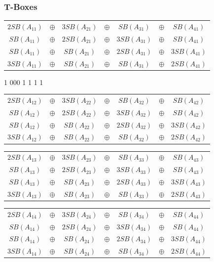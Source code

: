 \documentclass{beamer}
\begin{document}
\frame
{
	\frametitle{T-Boxes}
\tiny

\begin{tabular}{|ccccccc|}
$2SB(A_{11})$ & $\oplus$ & $3SB(A_{21})$ & $\oplus$ & $ SB(A_{31})$ & $\oplus$ & $ SB(A_{41})$\\
$ SB(A_{11})$ & $\oplus$ & $2SB(A_{21})$ & $\oplus$ & $3SB(A_{31})$ & $\oplus$ & $ SB(A_{41})$ \\
$ SB(A_{11})$ & $\oplus$ & $ SB(A_{21})$ & $\oplus$ & $2SB(A_{31})$ & $\oplus$ & $3SB(A_{41})$ \\
$3SB(A_{11})$ & $\oplus$ & $ SB(A_{21})$ & $\oplus$ & $ SB(A_{31})$ & $\oplus$ & $2SB(A_{41})$ 
\end{tabular}1 000 1 1 1 1
\vspace{0.5cm}

\begin{tabular}{|ccccccc|}
$2SB(A_{12})$ & $\oplus$ & $3SB(A_{22})$ & $\oplus$ & $ SB(A_{32})$ & $\oplus$ & $ SB(A_{42})$\\
$ SB(A_{12})$ & $\oplus$ & $2SB(A_{22})$ & $\oplus$ & $3SB(A_{32})$ & $\oplus$ & $ SB(A_{42})$ \\
$ SB(A_{12})$ & $\oplus$ & $ SB(A_{22})$ & $\oplus$ & $2SB(A_{32})$ & $\oplus$ & $3SB(A_{42})$ \\
$3SB(A_{12})$ & $\oplus$ & $ SB(A_{22})$ & $\oplus$ & $ SB(A_{32})$ & $\oplus$ & $2SB(A_{42})$ 
\end{tabular}
\vspace{0.5cm}

\begin{tabular}{|ccccccc|}
$2SB(A_{13})$ & $\oplus$ & $3SB(A_{23})$ & $\oplus$ & $ SB(A_{33})$ & $\oplus$ & $ SB(A_{43})$\\
$ SB(A_{13})$ & $\oplus$ & $2SB(A_{23})$ & $\oplus$ & $3SB(A_{33})$ & $\oplus$ & $ SB(A_{43})$ \\
$ SB(A_{13})$ & $\oplus$ & $ SB(A_{23})$ & $\oplus$ & $2SB(A_{33})$ & $\oplus$ & $3SB(A_{43})$ \\
$3SB(A_{13})$ & $\oplus$ & $ SB(A_{23})$ & $\oplus$ & $ SB(A_{33})$ & $\oplus$ & $2SB(A_{43})$ 
\end{tabular}
\vspace{0.5cm}

\begin{tabular}{|ccccccc|}
$2SB(A_{14})$ & $\oplus$ & $3SB(A_{24})$ & $\oplus$ & $ SB(A_{34})$ & $\oplus$ & $ SB(A_{44})$\\
$ SB(A_{14})$ & $\oplus$ & $2SB(A_{24})$ & $\oplus$ & $3SB(A_{34})$ & $\oplus$ & $ SB(A_{44})$ \\
$ SB(A_{14})$ & $\oplus$ & $ SB(A_{24})$ & $\oplus$ & $2SB(A_{34})$ & $\oplus$ & $3SB(A_{44})$ \\
$3SB(A_{14})$ & $\oplus$ & $ SB(A_{24})$ & $\oplus$ & $ SB(A_{34})$ & $\oplus$ & $2SB(A_{44})$ 
\end{tabular}


}
\end{document}
